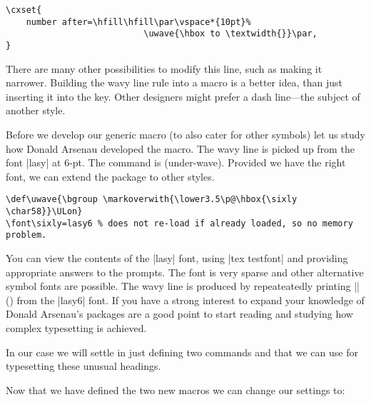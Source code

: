 \begin{scriptexample}{}{}
\begin{verbatim}
\cxset{
    number after=\hfill\hfill\par\vspace*{10pt}%
                           \uwave{\hbox to \textwidth{}}\par,
}
\end{verbatim}
\end{scriptexample}

There are many other possibilities to modify this line, such as making it narrower. Building the wavy line rule into
a macro is a better idea, than just inserting it into the key. Other designers might prefer a dash line---the subject of another style.
 
 Before we develop our generic macro (to also cater for other symbols) let us study how Donald Arsenau
 developed the macro. The wavy line is picked up from the font |lasy| at 6-pt. 
 The command is  \cmd{\uwave} (under-wave). Provided we have the right font, we can extend the package to
 other styles.

\begin{scriptexample}{}{}
\begin{verbatim}
\def\uwave{\bgroup \markoverwith{\lower3.5\p@\hbox{\sixly \char58}}\ULon}
\font\sixly=lasy6 % does not re-load if already loaded, so no memory problem.
\end{verbatim} 
\end{scriptexample}

You can view the contents of the |lasy| font, using |tex testfont| and providing appropriate answers to the prompts. The font is very sparse and other alternative symbol fonts are possible. The wavy line is produced by repeateatedly printing || ({\sixly{}}) from the |lasy6| font. If you have a strong interest to expand your knowledge of
\tex Donald Arsenau’s packages are a good point to start reading and studying how complex typesetting is achieved.
\bigskip

In our case we will settle in just defining two commands \cmd{\dashedrule} and \cmd{\uwaverule} that we can use for typesetting these unusual headings.

\begin{texexample}{}{}
\def\dashedrule{\dashuline{\hbox to \textwidth{}}}
\def\uwaverule{\uwave{\hbox to \textwidth{}}}
\end{texexample}

Now that we have defined the two new macros we can change our settings to:

